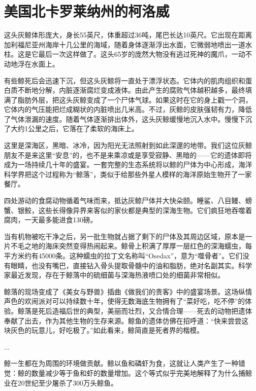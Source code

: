 \documentclass[12pt,oneside]{book}
\begin{document}
\section{美国北卡罗莱纳州的柯洛威}
\begin{bookref}[frametitle={\cite{好好告别}}]

这头灰鲸体形庞大，身长55英尺，体重超过36吨，尾巴长达10英尺。它出现在距离加利福尼亚州海岸十几公里的海域，随着身体逐渐浮出水面，它微弱地喷出一道水柱。这是它最后一次这样做了。这头65岁的庞然大物没有逃过死神的魔爪，一动不动地浮在水面上。

有些鲸死后会迅速下沉，但这头灰鲸将一直处于漂浮状态。它体内的肌肉组织和蛋白质不断地分解，内脏逐渐腐烂变成液体。由此产生的腐败气体越积越多，最终填满了脂肪外层，把这头灰鲸变成了一个尸体气球。如果这时在它的身上戳一个洞，它体内的气压能把烂成糊状的内脏喷出几米高。不过，灰鲸的皮肤强韧有力，降低了气体泄漏的速度。随着气体逐渐排出体外，这头灰鲸缓慢地沉入水中。慢慢下沉了大约1公里之后，它落在了柔软的海床上。

这里是深海区，黑暗、冰冷，因为阳光无法照射到如此深邃的地带。我们这位灰鲸朋友不是来这里“安息”的，也不是来乘凉或是享受寂静、黑暗的——它的遗体即将成为一场持续几十年的盛宴。一套完整的生态系统将以鲸的尸体为中心形成，海洋科学界把这个过程称为“鲸落”，类似于给那些外星人模样的海洋原始生物开了一家餐厅。

四处游动的食腐动物循着气味而来，抵达灰鲸尸体并大快朵颐。睡鲨、八目鳗、螃蟹、银鲛，这些长得像异界来客似的家伙都是典型的深海生物。它们疯狂地吞噬着腐肉，一天最多能进食130磅。

当有机物被吃干净之后，另一批生物就占据了剩下的尸体及其周边区域，原本是一片不毛之地的海床突然变得热闹起来。鲸骨上积满了厚厚一层红色的深海蠕虫，每平方米约有45000条。这种蠕虫的拉丁文名称叫“Osedax”，意为“噬骨者”。它们没有眼睛，也没有嘴巴，直接钻入骨头提取骨髓中的油和脂肪，绝对名副其实。科学家最近发现，存在于鲸落中的硫细菌与深海热液喷口处的细菌非常相似。

鲸落的现场变成了《美女与野兽》插曲《做我们的贵客》中的盛宴场景。这场纵情声色的欢闹派对可以持续数十年，使得无数海底生物拥有了“菜好吃，吃不停”的体验。鲸落是死后造福后世的典型，美丽而壮烈，又合情合理——死去的动物把遗体奉献了出去，作为其他生物的生存来源。鲸鱼的遗体仿佛在招呼道：“快来尝尝这块灰色的玩意儿，好吃极了。”如此看来，鲸简直是死者界的楷模。

...

鲸一生都在为周围的环境做贡献。鲸以鱼和磷虾为食，这就让人类产生了一种错觉：鲸的数量减少等于鱼和虾的数量增加。这个等式似乎完美地解释了为什么捕鲸业在20世纪至少屠杀了300万头鲸鱼。


\end{bookref}
\end{document}
